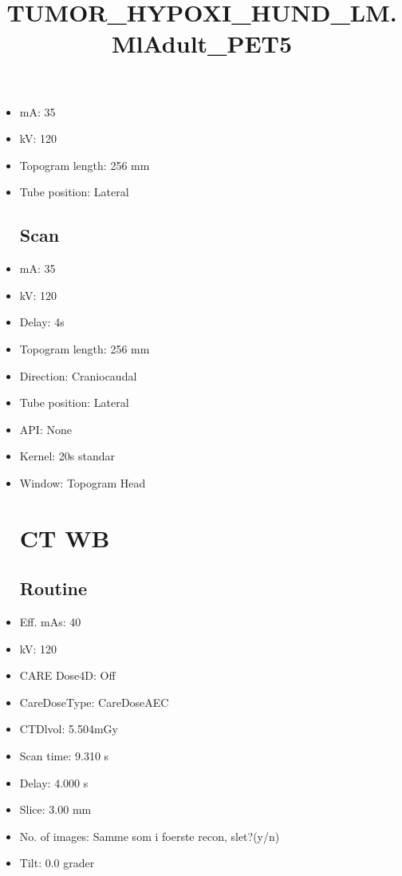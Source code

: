 \documentclass[12pt]{article}
\title{TUMOR\_HYPOXI\_HUND\_LM.MlAdult\_PET5}
\begin{document}
\maketitle
\newpage
\tableofcontents
\newpage
{}


\begin{itemize}\section{Topogram}
\subsection{Routine}
\item mA: 35\item kV: 120\item Topogram length: 256 mm\item Tube position: Lateral
\subsection{Scan}\item mA: 35\item kV: 120\item Delay: 4s\item Topogram length: 256 mm\item Direction: Craniocaudal\item Tube position: Lateral\item API: None\item Kernel: 20s standar\item Window: Topogram Head
\section{CT WB}
\subsection{Routine}
\item Eff. mAs: 40\item kV: 120\item CARE Dose4D: Off\item CareDoseType: CareDoseAEC\item CTDlvol: 5.504mGy\item Scan time: 9.310 s\item Delay: 4.000 s\item Slice: 3.00 mm\item No. of images: Samme som i foerste recon, slet?(y/n)\item Tilt: 0.0 grader

\end{itemize}
\end{document}
